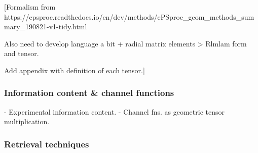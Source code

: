 [Formalism from https://epsproc.readthedocs.io/en/dev/methods/ePSproc_geom_methods_summary_190821-v1-tidy.html

Also need to develop language a bit + radial matrix elements > Rlmlam form and tensor.

Add appendix with definition of each tensor.]

\subsubsection{Information content \& channel functions}

- Experimental information content.
- Channel fns. as geometric tensor multiplication.

\subsubsection{Retrieval techniques}
